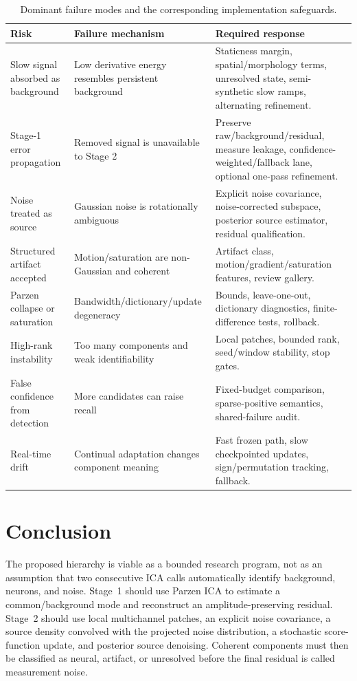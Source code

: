 \documentclass[11pt]{article}
\begin{document}
\begin{table}[H]
\centering
\small
\begin{tabularx}{\textwidth}{>{\raggedright\arraybackslash}p{}
                             >{\raggedright\arraybackslash}X
                             >{\raggedright\arraybackslash}X}
\toprule
Risk & Failure mechanism & Required response \\
\midrule
Slow signal absorbed as background & Low derivative energy resembles persistent
background & Staticness margin, spatial/morphology terms, unresolved state,
semi-synthetic slow ramps, alternating refinement. \\
Stage-1 error propagation & Removed signal is unavailable to Stage 2 & Preserve
raw/background/residual, measure leakage, confidence-weighted/fallback lane,
optional one-pass refinement. \\
Noise treated as source & Gaussian noise is rotationally ambiguous & Explicit
noise covariance, noise-corrected subspace, posterior source estimator, residual
qualification. \\
Structured artifact accepted & Motion/saturation are non-Gaussian and coherent &
Artifact class, motion/gradient/saturation features, review gallery. \\
Parzen collapse or saturation & Bandwidth/dictionary/update degeneracy & Bounds,
leave-one-out, dictionary diagnostics, finite-difference tests, rollback. \\
High-rank instability & Too many components and weak identifiability & Local
patches, bounded rank, seed/window stability, stop gates. \\
False confidence from detection & More candidates can raise recall & Fixed-budget
comparison, sparse-positive semantics, shared-failure audit. \\
Real-time drift & Continual adaptation changes component meaning & Fast frozen
path, slow checkpointed updates, sign/permutation tracking, fallback. \\
\bottomrule
\end{tabularx}
\caption{Dominant failure modes and the corresponding implementation safeguards.}
\end{table}

\section{Conclusion}

The proposed hierarchy is viable as a bounded research program, not as an
assumption that two consecutive ICA calls automatically identify background,
neurons, and noise. Stage~1 should use Parzen ICA to estimate a common/background
mode and reconstruct an amplitude-preserving residual. Stage~2 should use local
multichannel patches, an explicit noise covariance, a source density convolved
with the projected noise distribution, a stochastic score-function update, and
posterior source denoising. Coherent components must then be classified as
neural, artifact, or unresolved before the final residual is called measurement
noise.
\end{document}
